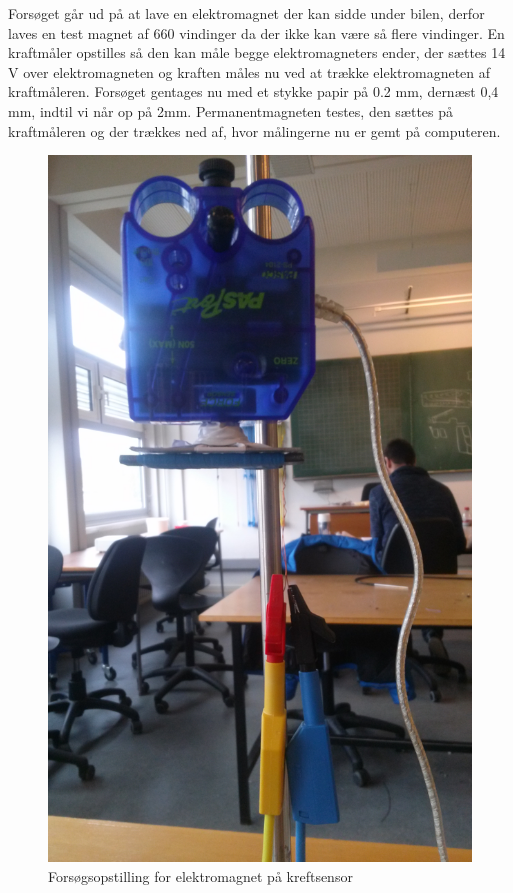 Forsøget går ud på at lave en elektromagnet der kan sidde under bilen, derfor laves en test magnet af 660 vindinger da der ikke kan være så flere vindinger. En kraftmåler opstilles så den kan måle begge elektromagneters ender, der sættes 14 V over elektromagneten og kraften måles nu ved at trække elektromagneten af kraftmåleren. Forsøget gentages nu med et stykke papir på 0.2 mm, dernæst 0,4 mm, indtil vi når op på 2mm. Permanentmagneten testes, den sættes på kraftmåleren og der trækkes ned af, hvor målingerne nu er gemt på computeren.

\begin{figure}[h!]
\center
\includegraphics[scale=0.05, angle=270]{./Graphics/Forsogs_opstilling}
\caption{Forsøgsopstilling for elektromagnet på kreftsensor}
\label{Opstilling}
\end{figure}

